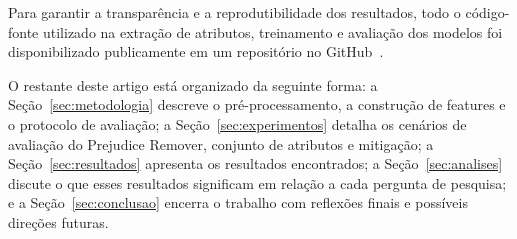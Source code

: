 Para garantir a transparência e a reprodutibilidade dos resultados, todo o código-fonte utilizado na extração de atributos, treinamento e avaliação dos modelos foi disponibilizado publicamente em um repositório no GitHub~\cite{gomes2026amproject}.

O restante deste artigo está organizado da seguinte forma: a Seção~\ref{sec:metodologia} descreve o pré-processamento, a construção de features e o protocolo de avaliação; a Seção~\ref{sec:experimentos} detalha os cenários de avaliação do Prejudice Remover, conjunto de atributos e mitigação; a Seção~\ref{sec:resultados} apresenta os resultados encontrados; a Seção~\ref{sec:analises} discute o que esses resultados significam em relação a cada pergunta de pesquisa; e a Seção~\ref{sec:conclusao} encerra o trabalho com reflexões finais e possíveis direções futuras.